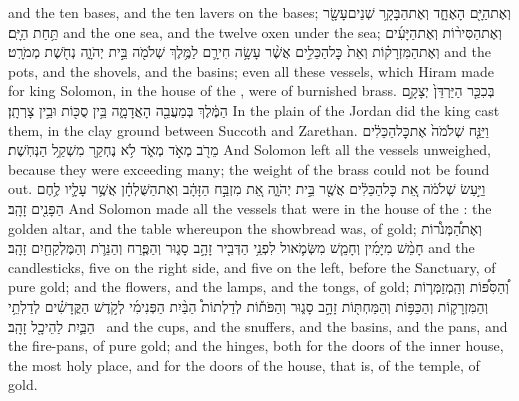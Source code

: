 {and the ten bases, and the ten lavers on the bases;}
{וְאֶת\maqqaf הַיָּ֖ם הָאֶחָ֑ד וְאֶת\maqqaf הַבָּקָ֥ר שְׁנֵים\maqqaf עָשָׂ֖ר תַּ֥חַת הַיָּֽם׃}
{and the one sea, and the twelve oxen under the sea;}
{וְאֶת\maqqaf הַסִּיר֨וֹת וְאֶת\maqqaf הַיָּעִ֜ים וְאֶת\maqqaf הַמִּזְרָק֗וֹת וְאֵת֙ כׇּל\maqqaf הַכֵּלִ֣ים  אֲשֶׁ֨ר עָשָׂ֥ה חִירָ֛ם לַמֶּ֥לֶךְ שְׁלֹמֹ֖ה בֵּ֣ית יְהֹוָ֑ה נְחֹ֖שֶׁת מְמֹרָֽט׃}
{and the pots, and the shovels, and the basins; even all these vessels, which Hiram made for king Solomon, in the house of the \lord, were of burnished brass.}
{בְּכִכַּ֤ר הַיַּרְדֵּן֙ יְצָקָ֣ם הַמֶּ֔לֶךְ בְּמַעֲבֵ֖ה הָאֲדָמָ֑ה בֵּ֥ין סֻכּ֖וֹת וּבֵ֥ין צָרְתָֽן׃}
{In the plain of the Jordan did the king cast them, in the clay ground between Succoth and Zarethan.}
{וַיַּנַּ֤ח שְׁלֹמֹה֙ אֶת\maqqaf כׇּל\maqqaf הַכֵּלִ֔ים מֵרֹ֖ב מְאֹ֣ד מְאֹ֑ד לֹ֥א נֶחְקַ֖ר מִשְׁקַ֥ל הַנְּחֹֽשֶׁת׃}
{And Solomon left all the vessels unweighed, because they were exceeding many; the weight of the brass could not be found out.}
{וַיַּ֣עַשׂ שְׁלֹמֹ֔ה אֵ֚ת כׇּל\maqqaf הַכֵּלִ֔ים אֲשֶׁ֖ר בֵּ֣ית יְהֹוָ֑ה אֵ֚ת מִזְבַּ֣ח הַזָּהָ֔ב וְאֶת\maqqaf הַשֻּׁלְחָ֗ן אֲשֶׁ֥ר עָלָ֛יו לֶ֥חֶם הַפָּנִ֖ים זָהָֽב׃}
{And Solomon made all the vessels that were in the house of the \lord: the golden altar, and the table whereupon the showbread was, of gold;}
{וְאֶת\maqqaf הַ֠מְּנֹר֠וֹת חָמֵ֨שׁ מִיָּמִ֜ין וְחָמֵ֧שׁ מִשְּׂמֹ֛אול לִפְנֵ֥י הַדְּבִ֖יר זָהָ֣ב סָג֑וּר וְהַפֶּ֧רַח וְהַנֵּרֹ֛ת וְהַמֶּלְקַחַ֖יִם זָהָֽב׃}
{and the candlesticks, five on the right side, and five on the left, before the Sanctuary, of pure gold; and the flowers, and the lamps, and the tongs, of gold;}
{וְ֠הַסִּפּ֠וֹת וְהַֽמְזַמְּר֧וֹת וְהַמִּזְרָק֛וֹת וְהַכַּפּ֥וֹת וְהַמַּחְתּ֖וֹת זָהָ֣ב סָג֑וּר וְהַפֹּת֡וֹת לְדַלְתוֹת֩ הַבַּ֨יִת הַפְּנִימִ֜י לְקֹ֣דֶשׁ הַקֳּדָשִׁ֗ים לְדַלְתֵ֥י הַבַּ֛יִת לַהֵיכָ֖ל זָהָֽב׃ \petucha }
{and the cups, and the snuffers, and the basins, and the pans, and the fire-pans, of pure gold; and the hinges, both for the doors of the inner house, the most holy place, and for the doors of the house, that is, of the temple, of gold.}
\label{haft_23}
